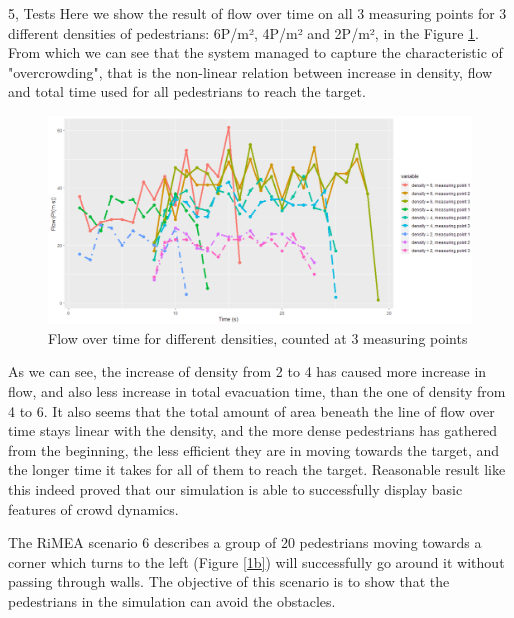 \documentclass[10pt,a4paper]{article}
\begin{document}
\begin{task}{5, Tests}
Here we show the result of flow over time on all 3 measuring points for 3 different densities of pedestrians: 6P/m², 4P/m² and 2P/m², in the Figure \ref{s42}. From which we can see that the system managed to capture the characteristic of "overcrowding", that is the non-linear relation between increase in density, flow and total time used for all pedestrians to reach the target.



\begin{figure}[H]
    \includegraphics[width=14cm]{scenario_4_2}
    \centering
    \caption{Flow over time for different densities, counted at 3 measuring points}
    \label{s42}
\end{figure}

As we can see, the increase of density from 2 to 4 has caused more increase in flow, and also less increase in total evacuation time, than the one of density from 4 to 6. It also seems that the total amount of area beneath the line of flow over time stays linear with the density, and the more dense pedestrians has gathered from the beginning, the less efficient they are in moving towards the target, and the longer time it takes for all of them to reach the target. Reasonable result like this indeed proved that our simulation is able to successfully display basic features of crowd dynamics.



The RiMEA scenario 6 describes a group of 20 pedestrians moving towards a corner which turns to the left (Figure \ref{1b}) will successfully go around it without passing through walls. The objective of this scenario is to show that the pedestrians in the simulation can avoid the obstacles.


\end{task}
\end{document}
